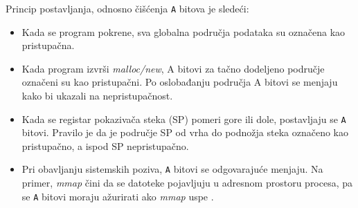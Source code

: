\documentclass[12pt,oneside]{memoir}
\theoremstyle{plain}
\theoremstyle{definition}
\begin{document}
Princip postavljanja, odnosno čišćenja \texttt{A} bitova je sledeći:
\begin{itemize}
\item Kada se program pokrene, sva globalna područja podataka su označena kao pristupačna.
\item Kada program izvrši \textit{malloc/new}, A bitovi za tačno dodeljeno područje označeni su kao pristupačni. Po oslobađanju područja A bitovi se menjaju kako bi ukazali na nepristupačnost.
\item Kada se registar pokazivača steka (SP) pomeri gore ili dole, postavljaju se \texttt{A} bitovi. Pravilo je da je područje SP od vrha do podnožja steka označeno kao pristupačno, a ispod SP nepristupačno. 
\item Pri obavljanju sistemskih poziva, \texttt{A} bitovi se odgovarajuće menjaju. Na primer, \textit{mmap} čini da se datoteke pojavljuju u adresnom prostoru procesa, pa se \texttt{A} bitovi moraju ažurirati ako \textit{mmap} uspe \cite{Memcheck}. 
\end{itemize}
\end{document}

